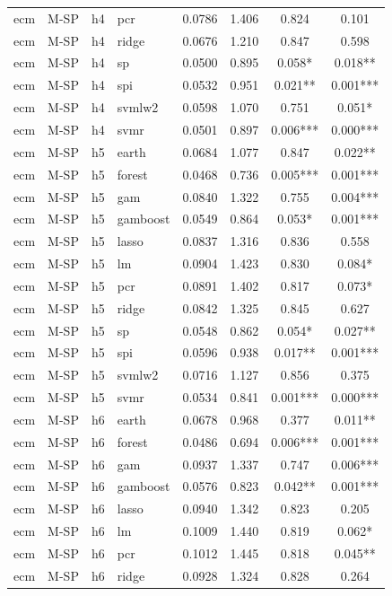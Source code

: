 \begin{ThreePartTable}
\begin{longtable}[t]{llclcccc}
ecm & M-SP & h4 & pcr & 0.0786 & 1.406 & 0.824 & 0.101\\
ecm & M-SP & h4 & ridge & 0.0676 & 1.210 & 0.847 & 0.598\\
ecm & M-SP & h4 & sp & 0.0500 & 0.895 & 0.058* & 0.018**\\
ecm & M-SP & h4 & spi & 0.0532 & 0.951 & 0.021** & 0.001***\\
ecm & M-SP & h4 & svmlw2 & 0.0598 & 1.070 & 0.751 & 0.051*\\
ecm & M-SP & h4 & svmr & 0.0501 & 0.897 & 0.006*** & 0.000***\\
\addlinespace
ecm & M-SP & h5 & earth & 0.0684 & 1.077 & 0.847 & 0.022**\\
ecm & M-SP & h5 & forest & 0.0468 & 0.736 & 0.005*** & 0.001***\\
ecm & M-SP & h5 & gam & 0.0840 & 1.322 & 0.755 & 0.004***\\
ecm & M-SP & h5 & gamboost & 0.0549 & 0.864 & 0.053* & 0.001***\\
ecm & M-SP & h5 & lasso & 0.0837 & 1.316 & 0.836 & 0.558\\
ecm & M-SP & h5 & lm & 0.0904 & 1.423 & 0.830 & 0.084*\\
ecm & M-SP & h5 & pcr & 0.0891 & 1.402 & 0.817 & 0.073*\\
ecm & M-SP & h5 & ridge & 0.0842 & 1.325 & 0.845 & 0.627\\
ecm & M-SP & h5 & sp & 0.0548 & 0.862 & 0.054* & 0.027**\\
ecm & M-SP & h5 & spi & 0.0596 & 0.938 & 0.017** & 0.001***\\
ecm & M-SP & h5 & svmlw2 & 0.0716 & 1.127 & 0.856 & 0.375\\
ecm & M-SP & h5 & svmr & 0.0534 & 0.841 & 0.001*** & 0.000***\\
\addlinespace
ecm & M-SP & h6 & earth & 0.0678 & 0.968 & 0.377 & 0.011**\\
ecm & M-SP & h6 & forest & 0.0486 & 0.694 & 0.006*** & 0.001***\\
ecm & M-SP & h6 & gam & 0.0937 & 1.337 & 0.747 & 0.006***\\
ecm & M-SP & h6 & gamboost & 0.0576 & 0.823 & 0.042** & 0.001***\\
ecm & M-SP & h6 & lasso & 0.0940 & 1.342 & 0.823 & 0.205\\
ecm & M-SP & h6 & lm & 0.1009 & 1.440 & 0.819 & 0.062*\\
ecm & M-SP & h6 & pcr & 0.1012 & 1.445 & 0.818 & 0.045**\\
ecm & M-SP & h6 & ridge & 0.0928 & 1.324 & 0.828 & 0.264\\

\end{longtable}
\end{ThreePartTable}
